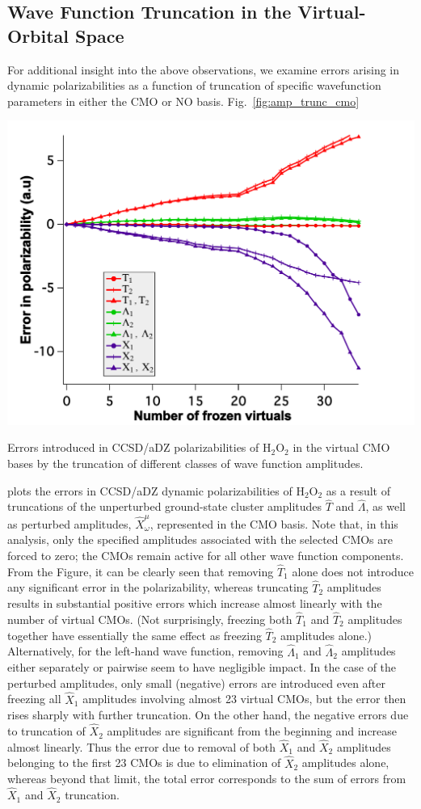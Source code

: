 \subsection{Wave Function Truncation in the Virtual-Orbital Space}

For additional insight into the above observations, we examine errors arising
in dynamic polarizabilities as a function of truncation of specific
wavefunction parameters in either the CMO or NO basis.
Fig.~\ref{fig:amp_trunc_cmo} 
\begin{MyFigure}[h!]
\centering
\includegraphics[width=0.6\linewidth,natwidth=610,natheight=642]{figures_fvno/amp_trunc_cmo.pdf}
\caption{{\footnotesize Errors introduced in CCSD/aDZ polarizabilities of
H$_2$O$_2$ in the virtual CMO bases by the truncation of different classes of wave
function amplitudes.}}
\label{fig:amp_trunc_cmo}
\end{MyFigure}
plots the errors in CCSD/aDZ dynamic polarizabilities of H$_2$O$_2$ as a result of truncations of the unperturbed
ground-state cluster amplitudes $\hat{T}$ and $\hat{\Lambda}$, as well as
perturbed amplitudes, $\hat{X}_\omega^\mu$, represented in the CMO basis.
Note that, in this analysis, only the specified amplitudes associated with the
selected CMOs are forced to zero; the CMOs remain active for all other wave
function components.  From the Figure, it can be clearly seen that removing
$\hat{T}_1$ alone does not introduce any significant error in the
polarizability, whereas truncating $\hat{T}_2$ amplitudes results in
substantial positive errors which increase almost linearly with the number of
virtual CMOs. (Not surprisingly, freezing both $\hat{T}_1$ and $\hat{T}_2$
amplitudes together have essentially the same effect as freezing $\hat{T}_2$
amplitudes alone.) Alternatively, for the left-hand wave function, removing
$\hat{\Lambda}_1$ and $\hat{\Lambda}_2$ amplitudes either separately or
pairwise seem to have negligible impact.  In the case of the perturbed
amplitudes, only small (negative) errors are introduced even after freezing
all $\hat{X}_1$ amplitudes involving almost 23 virtual CMOs, but the error
then rises sharply with further truncation.  On the other hand, the negative
errors due to truncation of $\hat{X}_2$ amplitudes are significant from the
beginning and increase almost linearly.  Thus the error due to removal of both
$\hat{X}_1$ and $\hat{X}_2$ amplitudes belonging to the first 23 CMOs is due
to elimination of $\hat{X}_2$ amplitudes alone, whereas beyond that limit, the
total error corresponds to the sum of errors from $\hat{X}_1$ and $\hat{X}_2$
truncation.

